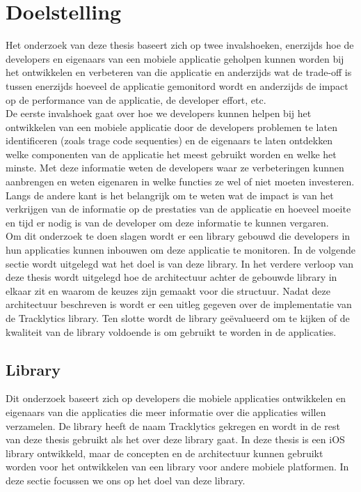 \chapter{Doelstelling}
Het onderzoek van deze thesis baseert zich op twee invalshoeken, enerzijds hoe de developers en eigenaars van een mobiele applicatie geholpen kunnen worden bij het ontwikkelen en verbeteren van die applicatie en anderzijds wat de trade-off is tussen enerzijds hoeveel de applicatie gemonitord wordt en anderzijds de impact op de performance van de applicatie, de developer effort, etc. \\

De eerste invalshoek gaat over hoe we developers kunnen helpen bij het ontwikkelen van een mobiele applicatie door de developers problemen te laten identificeren (zoals trage code sequenties) en de eigenaars te laten ontdekken welke componenten van de applicatie het meest gebruikt worden en welke het minste. Met deze informatie weten de developers waar ze verbeteringen kunnen aanbrengen en weten eigenaren in welke functies ze wel of niet moeten investeren. \\

Langs de andere kant is het belangrijk om te weten wat de impact is van het verkrijgen van de informatie op de prestaties van de applicatie en hoeveel moeite en tijd er nodig is van de developer om deze informatie te kunnen vergaren.\\


Om dit onderzoek te doen slagen wordt er een library gebouwd die developers in hun applicaties kunnen inbouwen om deze applicatie te monitoren. In de volgende sectie wordt uitgelegd wat het doel is van deze library. In het verdere verloop van deze thesis wordt uitgelegd hoe de architectuur achter de gebouwde library in elkaar zit en waarom de keuzes zijn gemaakt voor die structuur. Nadat deze architectuur beschreven is wordt er een uitleg gegeven over de implementatie van de Tracklytics library. Ten slotte wordt de library ge\"evalueerd om te kijken of de kwaliteit van de library voldoende is om gebruikt te worden in de applicaties. 

\section{Library}
Dit onderzoek baseert zich op developers die mobiele applicaties ontwikkelen en eigenaars van die applicaties die meer informatie over die applicaties willen verzamelen. De library heeft de naam Tracklytics gekregen en wordt in de rest van deze thesis gebruikt als het over deze library gaat. In deze thesis is een iOS library ontwikkeld, maar de concepten en de architectuur kunnen gebruikt worden voor het ontwikkelen van een library voor andere mobiele platformen. In deze sectie focussen we ons op het doel van deze library. \\


